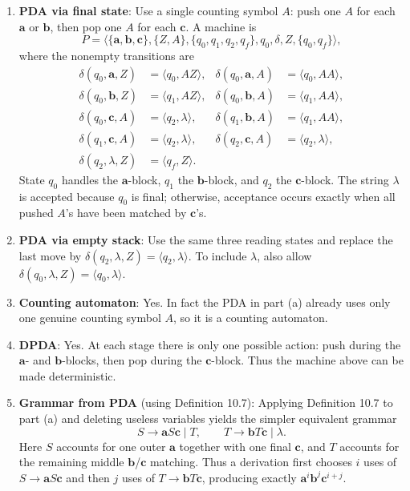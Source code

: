 \begin{enumerate}[{10.}1. ]
\begin{enumerate}
\item \textbf{PDA via final state}: Use a single counting symbol $A$: push one $A$ for each $\pmb{a}$ or $\pmb{b}$, then pop one $A$ for each $\pmb{c}$. A machine is
\[
P=\langle\{\pmb{a},\pmb{b},\pmb{c}\},\{Z,A\},\{q_0,q_1,q_2,q_f\},q_0,\delta,Z,\{q_0,q_f\}\rangle,
\]
where the nonempty transitions are
\begin{align*}
\delta(q_0,\pmb{a},Z)&=\langle q_0,AZ\rangle, &
\delta(q_0,\pmb{a},A)&=\langle q_0,AA\rangle, \\
\delta(q_0,\pmb{b},Z)&=\langle q_1,AZ\rangle, &
\delta(q_0,\pmb{b},A)&=\langle q_1,AA\rangle, \\
\delta(q_0,\pmb{c},A)&=\langle q_2,\lambda\rangle, &
\delta(q_1,\pmb{b},A)&=\langle q_1,AA\rangle, \\
\delta(q_1,\pmb{c},A)&=\langle q_2,\lambda\rangle, &
\delta(q_2,\pmb{c},A)&=\langle q_2,\lambda\rangle, \\
\delta(q_2,\lambda,Z)&=\langle q_f,Z\rangle. &&
\end{align*}
State $q_0$ handles the $\pmb{a}$-block, $q_1$ the $\pmb{b}$-block, and $q_2$ the $\pmb{c}$-block. The string $\lambda$ is accepted because $q_0$ is final; otherwise, acceptance occurs exactly when all pushed $A$'s have been matched by $\pmb{c}$'s.

\item \textbf{PDA via empty stack}: Use the same three reading states and replace the last move by $\delta(q_2,\lambda,Z)=\langle q_2,\lambda\rangle$. To include $\lambda$, also allow $\delta(q_0,\lambda,Z)=\langle q_0,\lambda\rangle$.

\item \textbf{Counting automaton}: Yes. In fact the PDA in part (a) already uses only one genuine counting symbol $A$, so it is a counting automaton.

\item \textbf{DPDA}: Yes. At each stage there is only one possible action: push during the $\pmb{a}$- and $\pmb{b}$-blocks, then pop during the $\pmb{c}$-block. Thus the machine above can be made deterministic.

\item \textbf{Grammar from PDA} (using Definition 10.7): Applying Definition 10.7 to part (a) and deleting useless variables yields the simpler equivalent grammar
\[
S \rightarrow \pmb{a}S\pmb{c}\mid T,\qquad
T \rightarrow \pmb{b}T\pmb{c}\mid \lambda.
\]
Here $S$ accounts for one outer $\pmb{a}$ together with one final
$\pmb{c}$, and $T$ accounts for the remaining middle
$\pmb{b}$/$\pmb{c}$ matching. Thus a derivation first chooses $i$ uses of
$S\to\pmb{a}S\pmb{c}$ and then $j$ uses of
$T\to\pmb{b}T\pmb{c}$, producing exactly
$\pmb{a}^i\pmb{b}^j\pmb{c}^{i+j}$.
\end{enumerate}


\end{enumerate}
